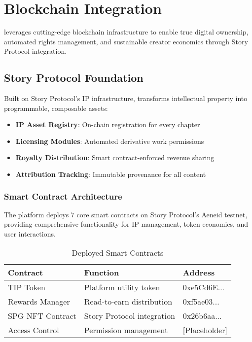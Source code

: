 \section{Blockchain Integration}
\label{sec:blockchain-integration}

\storyhouse{} leverages cutting-edge blockchain infrastructure to enable true digital ownership, automated rights management, and sustainable creator economics through Story Protocol integration.

\subsection{Story Protocol Foundation}

Built on Story Protocol's IP infrastructure, \storyhouse{} transforms intellectual property into programmable, composable assets:

\begin{itemize}
    \item \textbf{IP Asset Registry}: On-chain registration for every chapter
    \item \textbf{Licensing Modules}: Automated derivative work permissions
    \item \textbf{Royalty Distribution}: Smart contract-enforced revenue sharing
    \item \textbf{Attribution Tracking}: Immutable provenance for all content
\end{itemize}

\subsubsection{Smart Contract Architecture}

The platform deploys 7 core smart contracts on Story Protocol's Aeneid testnet, providing comprehensive functionality for IP management, token economics, and user interactions.

\begin{table}[H]
\centering
\caption{Deployed Smart Contracts}
\label{tab:smart-contracts}
\begin{tabular}{@{}lll@{}}
\toprule
\textbf{Contract} & \textbf{Function} & \textbf{Address} \\
\midrule
TIP Token & Platform utility token & 0xe5Cd6E... \\
Rewards Manager & Read-to-earn distribution & 0xf5ae03... \\
SPG NFT Contract & Story Protocol integration & 0x26b6aa... \\
Access Control & Permission management & [Placeholder] \\
\bottomrule
\end{tabular}
\end{table}

